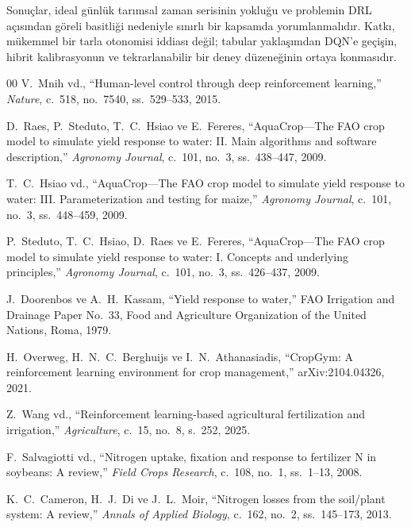 \documentclass[10pt,twocolumn,a4paper]{article}
\begin{document}
Sonu\c{c}lar, ideal g\"unl\"uk tar{\i}msal zaman serisinin yoklu\u{g}u ve problemin DRL a\c{c}{\i}s{\i}ndan g\"oreli basitli\u{g}i nedeniyle s{\i}n{\i}rl{\i} bir kapsamda yorumlanmal{\i}d{\i}r. Katk{\i}, m\"ukemmel bir tarla otonomisi iddias{\i} de\u{g}il; tabular yakla\c{s}{\i}mdan DQN'e ge\c{c}i\c{s}in, hibrit kalibrasyonun ve tekrarlanabilir bir deney d\"uzene\u{g}inin ortaya konmas{\i}d{\i}r.

\begin{thebibliography}{00}
V.~Mnih vd., ``Human-level control through deep reinforcement learning,'' \textit{Nature}, c.~518, no.~7540, ss.~529--533, 2015.

D.~Raes, P.~Steduto, T.~C.~Hsiao ve E.~Fereres, ``AquaCrop---The FAO crop model to simulate yield response to water: II. Main algorithms and software description,'' \textit{Agronomy Journal}, c.~101, no.~3, ss.~438--447, 2009.

T.~C.~Hsiao vd., ``AquaCrop---The FAO crop model to simulate yield response to water: III. Parameterization and testing for maize,'' \textit{Agronomy Journal}, c.~101, no.~3, ss.~448--459, 2009.

P.~Steduto, T.~C.~Hsiao, D.~Raes ve E.~Fereres, ``AquaCrop---The FAO crop model to simulate yield response to water: I. Concepts and underlying principles,'' \textit{Agronomy Journal}, c.~101, no.~3, ss.~426--437, 2009.

J.~Doorenbos ve A.~H.~Kassam, ``Yield response to water,'' FAO Irrigation and Drainage Paper No.~33, Food and Agriculture Organization of the United Nations, Roma, 1979.

H.~Overweg, H.~N.~C.~Berghuijs ve I.~N.~Athanasiadis, ``CropGym: A reinforcement learning environment for crop management,'' arXiv:2104.04326, 2021.

Z.~Wang vd., ``Reinforcement learning-based agricultural fertilization and irrigation,'' \textit{Agriculture}, c.~15, no.~8, s.~252, 2025.

F.~Salvagiotti vd., ``Nitrogen uptake, fixation and response to fertilizer N in soybeans: A review,'' \textit{Field Crops Research}, c.~108, no.~1, ss.~1--13, 2008.

K.~C.~Cameron, H.~J.~Di ve J.~L.~Moir, ``Nitrogen losses from the soil/plant system: A review,'' \textit{Annals of Applied Biology}, c.~162, no.~2, ss.~145--173, 2013.


\end{thebibliography}
\end{document}
